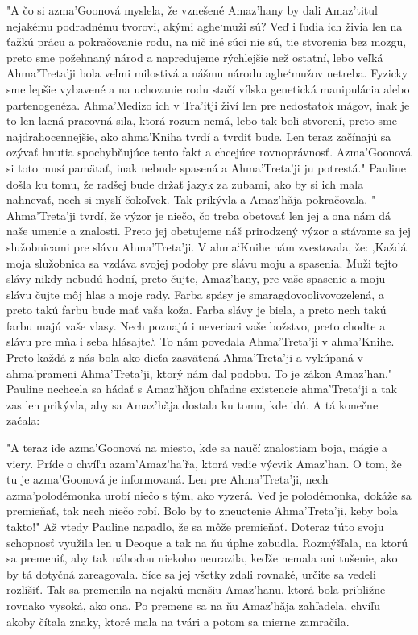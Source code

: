 \documentclass{book}
\begin{document}
"$ $A čo si azma'Goonová myslela, že vznešené Amaz'hany by dali Amaz'titul nejakému podradnému tvorovi, akými aghe‘muži sú? Veď i ľudia ich živia len na ťažkú prácu a pokračovanie rodu, na nič iné súci nie sú, tie stvorenia bez mozgu, preto sme požehnaný národ a napredujeme rýchlejšie než ostatní, lebo veľká Ahma'Treta'ji bola veľmi milostivá a nášmu národu aghe‘mužov netreba. Fyzicky sme lepšie vybavené a na uchovanie rodu stačí vílska genetická manipulácia alebo partenogenéza. Ahma'Medizo ich v Tra'itji živí len pre nedostatok mágov, inak je to len lacná pracovná sila, ktorá rozum nemá, lebo tak boli stvorení, preto sme najdrahocennejšie, ako ahma'Kniha tvrdí a tvrdiť bude. Len teraz začínajú sa ozývať hnutia spochybňujúce tento fakt a chcejúce rovnoprávnosť. Azma'Goonová si toto musí pamätať, inak nebude spasená a Ahma'Treta'ji ju potrestá."$ $ Pauline došla ku tomu, že radšej bude držať jazyk za zubami, ako by si ich mala nahnevať, nech si myslí čokoľvek. Tak prikývla a Amaz'ha\v{}ja pokračovala. "$ $Ahma'Treta'ji tvrdí, že výzor je niečo, čo treba obetovať len jej a ona nám dá naše umenie a znalosti. Preto jej obetujeme náš prirodzený výzor a stávame sa jej služobnicami pre slávu Ahma'Treta'ji. V ahma‘Knihe nám zvestovala, že: ‚Každá moja služobnica sa vzdáva svojej podoby pre slávu moju a spasenia. Muži tejto slávy nikdy nebudú hodní, preto čujte, Amaz'hany, pre vaše spasenie a moju slávu čujte môj hlas a moje rady. Farba spásy je smaragdovoolivovozelená, a preto takú farbu bude mať vaša koža. Farba slávy je biela, a preto nech takú farbu majú vaše vlasy. Nech poznajú i neveriaci vaše božstvo, preto choďte a slávu pre mňa i seba hlásajte.‘. To nám povedala Ahma'Treta'ji v ahma'Knihe. Preto každá z nás bola ako dieťa zasvätená Ahma'Treta'ji a vykúpaná v ahma'prameni Ahma'Treta'ji, ktorý nám dal podobu. To je zákon Amaz'han."$ $ Pauline nechcela sa hádať s Amaz'ha\v{}jou ohľadne existencie ahma'Treta‘ji a tak zas len prikývla, aby sa Amaz'ha\v{}ja dostala ku tomu, kde idú. A tá konečne začala:

"$ $A teraz ide azma'Goonová na miesto, kde sa naučí znalostiam boja, mágie a viery. Príde o chvíľu azam'Amaz'ha'r\v{}a, ktorá vedie výcvik Amaz'han. O tom, že tu je azma'Goonová je informovaná. Len pre Ahma'Treta'ji, nech azma'polodémonka urobí niečo s tým, ako vyzerá. Veď je polodémonka, dokáže sa premieňať, tak nech niečo robí. Bolo by to zneuctenie Ahma'Treta'ji, keby bola takto!"$ $ Až vtedy Pauline napadlo, že sa môže premieňať. Doteraz túto svoju schopnosť využila len u Deoque a tak na ňu úplne zabudla. Rozmýšľala, na ktorú sa premeniť, aby tak náhodou niekoho neurazila, keďže nemala ani tušenie, ako by tá dotyčná zareagovala. Síce sa jej všetky zdali rovnaké, určite sa vedeli rozlíšiť. Tak sa premenila na nejakú menšiu Amaz'hanu, ktorá bola približne rovnako vysoká, ako ona. Po premene sa na ňu Amaz'ha\v{}ja zahľadela, chvíľu akoby čítala znaky, ktoré mala na tvári a potom sa mierne zamračila.
\end{document}
